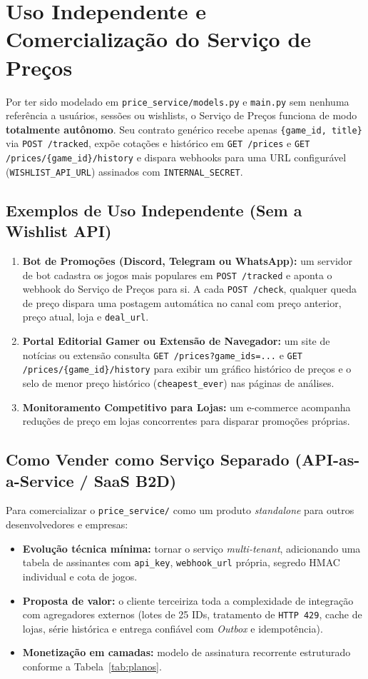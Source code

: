 \documentclass[11pt,a4paper]{article}
\begin{document}
\section{Uso Independente e Comercialização do Serviço de Preços}

Por ter sido modelado em \texttt{price\_service/models.py} e \texttt{main.py} sem nenhuma referência a usuários, sessões ou wishlists, o Serviço de Preços funciona de modo \textbf{totalmente autônomo}. Seu contrato genérico recebe apenas \texttt{\{game\_id, title\}} via \texttt{POST /tracked}, expõe cotações e histórico em \texttt{GET /prices} e \texttt{GET /prices/\{game\_id\}/history} e dispara webhooks para uma URL configurável (\texttt{WISHLIST\_API\_URL}) assinados com \texttt{INTERNAL\_SECRET}.

\subsection{Exemplos de Uso Independente (Sem a Wishlist API)}
\begin{enumerate}
    \item \textbf{Bot de Promoções (Discord, Telegram ou WhatsApp):} um servidor de bot cadastra os jogos mais populares em \texttt{POST /tracked} e aponta o webhook do Serviço de Preços para si. A cada \texttt{POST /check}, qualquer queda de preço dispara uma postagem automática no canal com preço anterior, preço atual, loja e \texttt{deal\_url}.
    \item \textbf{Portal Editorial Gamer ou Extensão de Navegador:} um site de notícias ou extensão consulta \texttt{GET /prices?game\_ids=...} e \texttt{GET /prices/\{game\_id\}/history} para exibir um gráfico histórico de preços e o selo de menor preço histórico (\texttt{cheapest\_ever}) nas páginas de análises.
    \item \textbf{Monitoramento Competitivo para Lojas:} um e-commerce acompanha reduções de preço em lojas concorrentes para disparar promoções próprias.
\end{enumerate}

\subsection{Como Vender como Serviço Separado (API-as-a-Service / SaaS B2D)}
Para comercializar o \texttt{price\_service/} como um produto \textit{standalone} para outros desenvolvedores e empresas:
\begin{itemize}
    \item \textbf{Evolução técnica mínima:} tornar o serviço \textit{multi-tenant}, adicionando uma tabela de assinantes com \texttt{api\_key}, \texttt{webhook\_url} própria, segredo HMAC individual e cota de jogos.
    \item \textbf{Proposta de valor:} o cliente terceiriza toda a complexidade de integração com agregadores externos (lotes de 25 IDs, tratamento de \texttt{HTTP 429}, cache de lojas, série histórica e entrega confiável com \textit{Outbox} e idempotência).
    \item \textbf{Monetização em camadas:} modelo de assinatura recorrente estruturado conforme a Tabela~\ref{tab:planos}.
\end{itemize}
\end{document}
